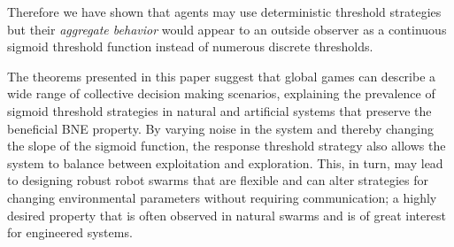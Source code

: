 \documentclass[12pt]{article}
\begin{document}
Therefore we have shown that agents may use deterministic threshold strategies but their \emph{aggregate behavior} would appear to an outside observer as a continuous sigmoid threshold function instead of numerous discrete thresholds.

The theorems presented in this paper suggest that global games can  describe a wide range of collective decision making scenarios, explaining the prevalence of sigmoid threshold strategies in natural and artificial systems that preserve the beneficial BNE property. By varying noise in the system and thereby changing the slope of the sigmoid function, the response threshold strategy also allows the system to balance between exploitation and exploration. This, in turn, may lead to designing robust robot swarms that are flexible and can alter strategies for changing environmental parameters without requiring communication; a highly desired property that is often observed in natural swarms and is of great interest for engineered systems.



\newpage
\end{document}
